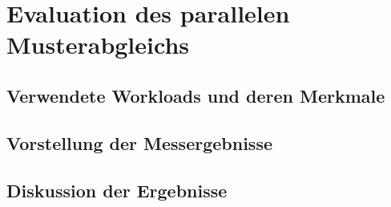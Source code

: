 \chapter{Evaluation des parallelen Musterabgleichs}

\section{Verwendete Workloads und deren Merkmale}

\section{Vorstellung der Messergebnisse}

\section{Diskussion der Ergebnisse}
